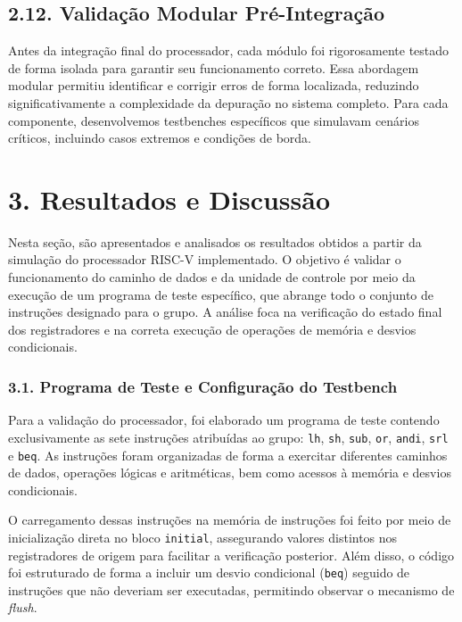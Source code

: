 \documentclass[12pt, a4paper]{article}
\begin{document}
\subsection*{2.12. Validação Modular Pré-Integração}

Antes da integração final do processador, cada módulo foi rigorosamente testado de forma isolada para garantir seu funcionamento correto. Essa abordagem modular permitiu identificar e corrigir erros de forma localizada, reduzindo significativamente a complexidade da depuração no sistema completo. Para cada componente, desenvolvemos testbenches específicos que simulavam cenários críticos, incluindo casos extremos e condições de borda.


\section*{3. Resultados e Discussão}

Nesta seção, são apresentados e analisados os resultados obtidos a partir da simulação do processador RISC-V implementado. O objetivo é validar o funcionamento do caminho de dados e da unidade de controle por meio da execução de um programa de teste específico, que abrange todo o conjunto de instruções designado para o grupo. A análise foca na verificação do estado final dos registradores e na correta execução de operações de memória e desvios condicionais.

\subsubsection*{3.1. Programa de Teste e Configuração do Testbench}

Para a validação do processador, foi elaborado um programa de teste contendo exclusivamente as sete instruções atribuídas ao grupo: \texttt{lh}, \texttt{sh}, \texttt{sub}, \texttt{or}, \texttt{andi}, \texttt{srl} e \texttt{beq}. As instruções foram organizadas de forma a exercitar diferentes caminhos de dados, operações lógicas e aritméticas, bem como acessos à memória e desvios condicionais.

O carregamento dessas instruções na memória de instruções foi feito por meio de inicialização direta no bloco \texttt{initial}, assegurando valores distintos nos registradores de origem para facilitar a verificação posterior. Além disso, o código foi estruturado de forma a incluir um desvio condicional (\texttt{beq}) seguido de instruções que não deveriam ser executadas, permitindo observar o mecanismo de \textit{flush}.
\end{document}

